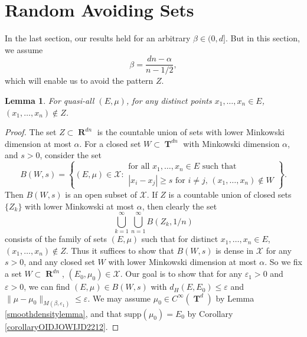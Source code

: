 \documentclass[12pt,reqno]{article}
\numberwithin{equation}{section}
\DeclareMathOperator{\RR}{\mathbf{R}}
\DeclareMathOperator{\TT}{\mathbf{T}}
\newtheorem{lemma}{Lemma}
\begin{document}
\section{Random Avoiding Sets} 

In the last section, our results held for an arbitrary $\beta \in (0,d]$. But in this section, we assume
%
\[ \beta = \frac{dn - \alpha}{n - 1/2}, \]
%
which will enable us to avoid the pattern $Z$.

\begin{lemma}
    For quasi-all $(E,\mu)$, for any distinct points $x_1, \dots, x_n \in E$, $(x_1, \dots, x_n) \not \in Z$.
\end{lemma}
\begin{proof}
    The set $Z \subset \RR^{dn}$ is the countable union of sets with lower Minkowski dimension at most $\alpha$. For a closed set $W \subset \TT^{dn}$ with Minkowski dimension $\alpha$, and $s > 0$, consider the set
    \[ B(W,s) = \left\{ (E,\mu) \in \mathcal{X}: \begin{array}{c}
            \text{for all $x_1, \dots, x_n \in E$ such that}\\
            \text{$|x_i - x_j| \geq s$ for $i \neq j$, $(x_1, \dots, x_n) \not \in W$}
        \end{array} \right\}. \]
    Then $B(W,s)$ is an open subset of $\mathcal{X}$. If $Z$ is a countable union of closed sets $\{ Z_k \}$ with lower Minkowski at most $\alpha$, then clearly the set
    \[ \bigcup_{k = 1}^\infty \bigcup_{n = 1}^\infty B(Z_k,1/n) \]
    consists of the family of sets $(E,\mu)$ such that for distinct $x_1, \dots, x_n \in E$, $(x_1, \dots, x_n) \not \in Z$. Thus it suffices to show that $B(W,s)$ is dense in $\mathcal{X}$ for any $s > 0$, and any closed set $W$ with lower Minkowski dimension at most $\alpha$. So we fix a set $W \subset \RR^{dn}$, $(E_0,\mu_0) \in \mathcal{X}$. Our goal is to show that for any $\varepsilon_1 > 0$ and $\varepsilon > 0$, we can find $(E,\mu) \in B(W,s)$ with $d_H(E,E_0) \leq \varepsilon$ and $\| \mu - \mu_0 \|_{M(\beta,\varepsilon_1)} \leq \varepsilon$. We may assume $\mu_0 \in C^\infty(\TT^d)$ by Lemma \ref{smoothdensitylemma}, and that $\text{supp}(\mu_0) = E_0$ by Corollary \ref{corollaryOIDJOWIJD2212}.


\end{proof}
\end{document}
